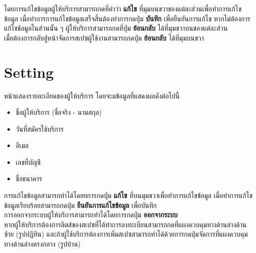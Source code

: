 โดยการแก้ไขข้อมูลผู้ให้บริการสามารถกดที่คำว่า \textbf{แก้ไข} ที่มุมบนขวาของแต่ละส่วนเพื่อทำการแก้ไขข้อมูล เมื่อทำการการแก้ไขข้อมูลเสร็จสิ้นต้องทำการกดปุ่ม \textbf{บันทึก} เพื่อยืนยันการแก้ไข หากไม่ต้องการแก้ไชช้อมูลในส่วนนั้น ๆ ผู้ให้บริการสามารถกดที่ปุ่ม \textbf{ย้อนกลับ} ได้ที่มุมขวาบนของแต่ละส่วน \\
เมื่อต้องการกลับสู้หน้าจัดการสเปซผู้ใช้งานสามารถกดปุ่ม \textbf{ย้อนกลับ} ได้ที่มุมบนขวา

\section{Setting}
หน้าแสดงรายละเอียดของผู้ให้บริการ โดยจะมข้อมูลที่แสดงผลดังต่อไปนี้
\begin{itemize}
    \item ชื่อผู้ให้บริการ (ชื่อจริง - นามสกุล)
    \item วันที่สมัครใช้บริการ
    \item อีเมล
    \item เลขที่บัญชี
    \item ชื่อธนาคาร
\end{itemize}
การแก้ไขข้อมูลสามารถทำได้โดยยการกดปุ่ม \textbf{แก้ไข} ที่บนมุมขวาเพื่อทำการแก้ไขข้อมูล เมื่อทำการแก้ไขข้อมูลเรียบร้อยสามารถกดปุ่ม \textbf{ยืนยันการแก้ไขข้อมูล} เพื่อบันทึก \\
การออกจากระบบผู้ให้บริการสามารถทำได้โดยการกดปุ่ม \textbf{ออกจากระบบ} \\
หากผู้ให้บริการต้องการลิตส์ของสเปซที่ได้ทำการลงทะเบียนสามารถกดที่แผงควบคุมทางด้านล่างด้านซ้าย   (รูปปฏิทิน) และถ้าผู้ใช้บริการต้องการเพิ่มสเปซสามารถทำได้ด้วยการกดปุ่มจัดการที่แผงควบคุมทางด้านล่างตรงกลาง (รูปบ้าน)












